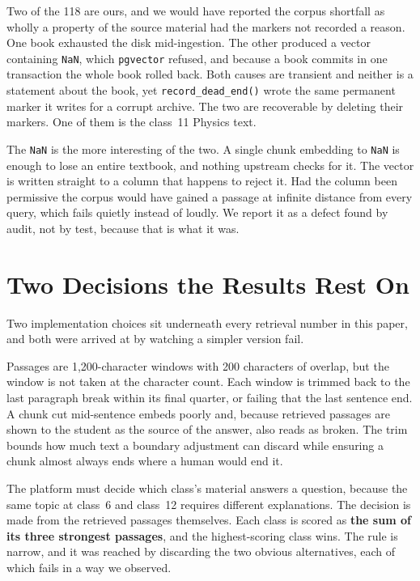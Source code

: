 Two of the 118 are ours, and we would have reported the corpus shortfall as wholly a property of the source material had the markers not recorded a reason. One book exhausted the disk mid-ingestion. The other produced a vector containing \texttt{NaN}, which \texttt{pgvector} refused, and because a book commits in one transaction the whole book rolled back. Both causes are transient and neither is a statement about the book, yet \texttt{record\_dead\_end()} wrote the same permanent marker it writes for a corrupt archive. The two are recoverable by deleting their markers. One of them is the class~11 Physics text.

The \texttt{NaN} is the more interesting of the two. A single chunk embedding to \texttt{NaN} is enough to lose an entire textbook, and nothing upstream checks for it. The vector is written straight to a column that happens to reject it. Had the column been permissive the corpus would have gained a passage at infinite distance from every query, which fails quietly instead of loudly. We report it as a defect found by audit, not by test, because that is what it was.
\fi

\ifconf\else  %
\section{Two Decisions the Results Rest On}
\label{sec:decisions}

Two implementation choices sit underneath every retrieval number in this paper, and both were arrived at by watching a simpler version fail.

Passages are 1{,}200-character windows with 200 characters of overlap, but the window is not taken at the character count. Each window is trimmed back to the last paragraph break within its final quarter, or failing that the last sentence end. A chunk cut mid-sentence embeds poorly and, because retrieved passages are shown to the student as the source of the answer, also reads as broken. The trim bounds how much text a boundary adjustment can discard while ensuring a chunk almost always ends where a human would end it.

\label{sec:grade}
The platform must decide which class's material answers a question, because the same topic at class~6 and class~12 requires different explanations. The decision is made from the retrieved passages themselves. Each class is scored as \textbf{the sum of its three strongest passages}, and the highest-scoring class wins. The rule is narrow, and it was reached by discarding the two obvious alternatives, each of which fails in a way we observed.

